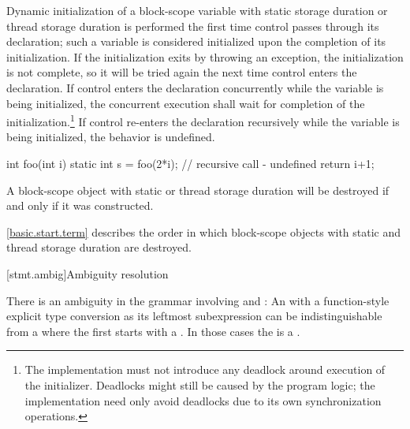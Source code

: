 \pnum
{}%
%
%
%
Dynamic initialization of a block-scope variable with
static storage duration or
thread storage duration is performed
the first time control passes through its declaration; such a variable is
considered initialized upon the completion of its initialization. If the
initialization exits by throwing an exception, the initialization is not
complete, so it will be tried again the next time control enters the
declaration.
If control enters the declaration concurrently while the variable is
being initialized, the concurrent execution shall wait for completion
of the initialization.\footnote{The implementation must not introduce
any deadlock around execution of the initializer. Deadlocks might
still be caused by the program logic; the implementation need only
avoid deadlocks due to its own synchronization operations.} If control
re-enters the declaration recursively while
the variable is being initialized, the behavior is undefined.
\begin{example}

\begin{codeblock}
int foo(int i) {
  static int s = foo(2*i);      // recursive call - undefined
  return i+1;
}
\end{codeblock}
\end{example}

\pnum
{}%
A block-scope object with static or thread storage duration will be
destroyed if and only if it was constructed.
\begin{note}
\ref{basic.start.term} describes the order in which block-scope objects with
static and thread storage duration are destroyed.
\end{note}

[stmt.ambig]{Ambiguity resolution}%

\pnum
There is an ambiguity in the grammar involving
 and : An
 with a function-style explicit type
conversion as its leftmost subexpression can be
indistinguishable from a  where the first
 starts with a \tcode{(}. In those cases the
 is a .

